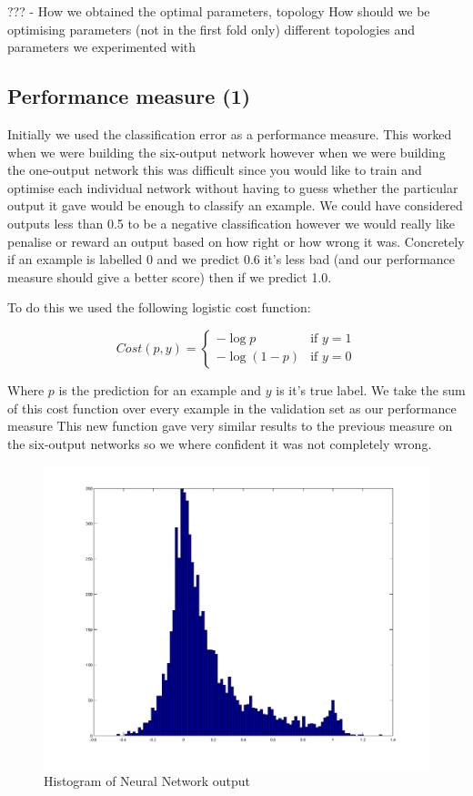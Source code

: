 \documentclass[10pt,a4paper]{article}
\begin{document}
???
- How we obtained the optimal parameters, topology
How should we be optimising parameters (not in the first fold only)
different topologies and parameters we experimented with

\subsection{Performance measure (1)}
Initially we used the classification error as a performance measure. 
This worked when we were building the six-output network however when we were building the one-output network this was difficult since you would like to train and optimise each individual network without having to guess whether the particular output it gave would be enough to classify an example.
We could have considered outputs less than 0.5 to be a negative classification however we would really like penalise or reward an output based on how right or how wrong it was.
Concretely if an example is labelled 0 and we predict 0.6 it's less bad (and our performance measure should give a better score) then if we predict 1.0. 

To do this we used the following logistic cost function:

\[
    Cost(p, y)= 
\begin{cases}
    -\log{p}& \text{if } y = 1\\
    -\log{(1 - p)}              & \text{if } y = 0
\end{cases}
\]

Where $p$ is the prediction for an example and $y$ is it's true label.
We take the sum of this cost function over every example in the validation set as our performance measure 
This new function gave very similar results to the previous measure on the six-output networks so we where confident it was not completely wrong.

\begin{figure}[!ht]
     \centering
     \includegraphics[width=\textwidth]{../../images/clean_hist.png}
     \caption{Histogram of Neural Network output}
     \label{fig:tree2}
\end{figure}
\end{document}
